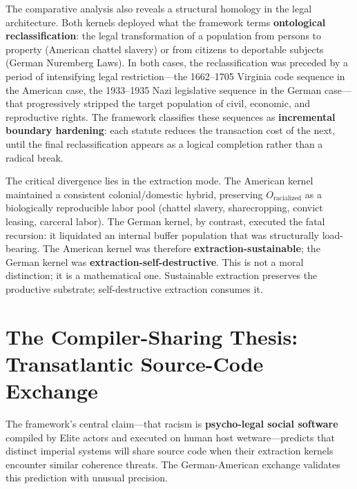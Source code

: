 The comparative analysis also reveals a structural homology in the legal architecture. Both kernels deployed what the framework terms \textbf{ontological reclassification}: the legal transformation of a population from persons to property (American chattel slavery) or from citizens to deportable subjects (German Nuremberg Laws). In both cases, the reclassification was preceded by a period of intensifying legal restriction---the 1662--1705 Virginia code sequence in the American case, the 1933--1935 Nazi legislative sequence in the German case---that progressively stripped the target population of civil, economic, and reproductive rights. The framework classifies these sequences as \textbf{incremental boundary hardening}: each statute reduces the transaction cost of the next, until the final reclassification appears as a logical completion rather than a radical break.

The critical divergence lies in the extraction mode. The American kernel maintained a consistent colonial/domestic hybrid, preserving $O_{\text{racialized}}$ as a biologically reproducible labor pool (chattel slavery, sharecropping, convict leasing, carceral labor). The German kernel, by contrast, executed the fatal recursion: it liquidated an internal buffer population that was structurally load-bearing. The American kernel was therefore \textbf{extraction-sustainable}; the German kernel was \textbf{extraction-self-destructive}. This is not a moral distinction; it is a mathematical one. Sustainable extraction preserves the productive substrate; self-destructive extraction consumes it.


\section{The Compiler-Sharing Thesis: Transatlantic Source-Code Exchange}
\label{sec:compiler_sharing}

The framework's central claim---that racism is \textbf{psycho-legal social software} compiled by Elite actors and executed on human host wetware---predicts that distinct imperial systems will share source code when their extraction kernels encounter similar coherence threats. The German-American exchange validates this prediction with unusual precision.

